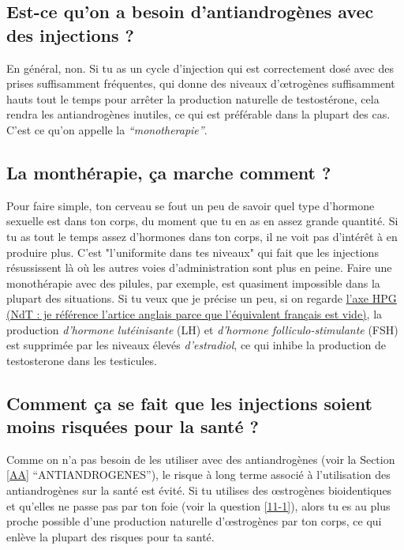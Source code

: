 \documentclass{article}
\begin{document}
\subsection{Est-ce qu'on a besoin d'antiandrogènes avec des injections ?}

En général, non. Si tu as un cycle d'injection qui est correctement dosé avec des prises suffisamment fréquentes, qui donne des niveaux d'œtrogènes suffisamment hauts tout le temps pour arrêter la production naturelle de testostérone, cela rendra les antiandrogènes inutiles, ce qui est préférable dans la plupart des cas. C'est ce qu'on appelle la \textit{“monotherapie”}.

\subsection{La monthérapie, ça marche comment ?}\label{2-3}

Pour faire simple, ton cerveau se fout un peu de savoir quel type d'hormone sexuelle est dans ton corps, du moment que tu en as en assez grande quantité. Si tu as tout le temps assez d'hormones dans ton corps, il ne voit pas d'intérêt à en produire plus. C'est "l'uniformite dans tes niveaux" qui fait que les injections résussissent là où les autres voies d'administration sont plus en peine. Faire une monothérapie avec des pilules, par exemple, est quasiment impossible dans la plupart des situations. Si tu veux que je précise un peu, si on regarde \href{https://en.wikipedia.org/wiki/Hypothalamic-pituitary-gonadal_axis}{l'axe HPG (NdT : je référence l'artice anglais parce que l'équivalent français est vide)}, la production \textit{d'hormone lutéinisante} (LH) et \textit{d'hormone folliculo-stimulante} (FSH) est supprimée par les niveaux élevés \textit{d'estradiol}, ce qui inhibe la production de testosterone dans les testicules. 

\subsection{Comment ça se fait que les injections soient moins risquées pour la santé ?}

Comme on n'a pas besoin de les utiliser avec des antiandrogènes (voir la Section \ref{AA} “ANTIANDROGENES”), le risque à long terme associé à l'utilisation des antiandrogènes sur la santé est évité. Si tu utilises des œstrogènes bioidentiques et qu'elles ne passe pas par ton foie (voir la question \ref{11-1}), alors tu es au plus proche possible d'une production naturelle d'œstrogènes par ton corps, ce qui enlève la plupart des risques pour ta santé.
\end{document}
